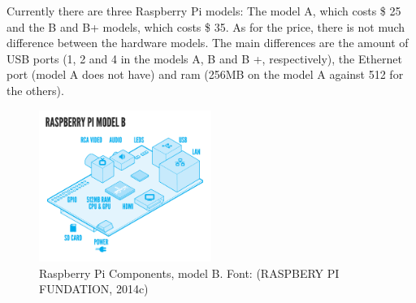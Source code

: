 \documentclass{acm_proc_article-sp}
\begin{document}
\newline
\newline
Currently there are three  Raspberry Pi models: The model A, which costs \$ 25 and the B and B+ models, which costs \$ 35. As for the price, there is not much difference between the hardware models. The main differences are the amount of USB ports (1, 2 and 4 in the models A, B and B +, respectively), the Ethernet port (model A does not have) and ram (256MB on the model A against 512 for the others).
\begin{figure}[h]
    \includegraphics[width=0.5\textwidth,natwidth=610,natheight=642]{pictures/RaspiModelB.png}
    \caption{Raspberry Pi Components, model B. Font: (RASPBERY PI FUNDATION, 2014c)}
    \label{fig:raspi}
\end{figure}
\end{document}

